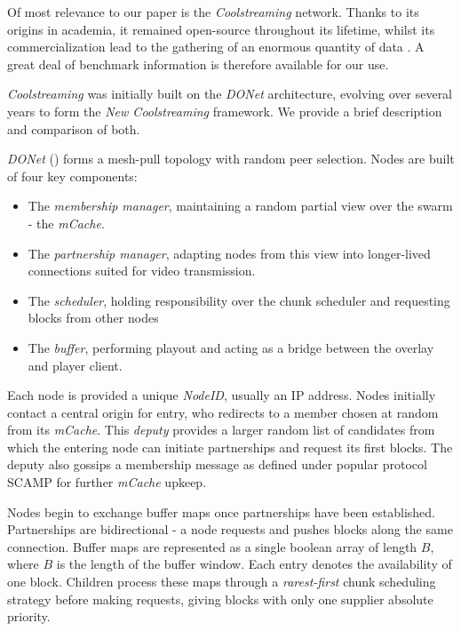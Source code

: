 \documentclass[12pt,a4paper]{article}
\begin{document}
Of most relevance to our paper is the \textit{Coolstreaming} network. Thanks to its origins in academia, it remained open-source throughout its lifetime, whilst its commercialization lead to the gathering of an enormous quantity of data \cite{Li2007}. A great deal of benchmark information is therefore available for our use.

\textit{Coolstreaming} was initially built on the \textit{DONet} architecture, evolving over several years to form the \textit{New Coolstreaming} framework. We provide a brief description and comparison of both.

\textit{DONet} (\cite{Zhang2005}) forms a mesh-pull topology with random peer selection. Nodes are built of four key components:

\begin{itemize}
	\item The \textit{membership manager}, maintaining a random partial view over the swarm - the \textit{mCache}.
	\item The \textit{partnership manager}, adapting nodes from this view into longer-lived connections suited for video transmission.
	\item The \textit{scheduler}, holding responsibility over the chunk scheduler and requesting blocks from other nodes
	\item The \textit{buffer}, performing playout and acting as a bridge between the overlay and player client.
\end{itemize} 

Each node is provided a unique \textit{NodeID}, usually an IP address. Nodes initially contact a central origin for entry, who redirects to a member chosen at random from its \textit{mCache}. This \textit{deputy} provides a larger random list of candidates from which the entering node can initiate partnerships and request its first blocks. The deputy also gossips a membership message as defined under popular protocol SCAMP for further \textit{mCache} upkeep.

Nodes begin to exchange buffer maps once partnerships have been established. Partnerships are bidirectional - a node requests and pushes blocks along the same connection. Buffer maps are represented as a single boolean array of length \(B\), where \(B\) is the length of the buffer window. Each entry denotes the availability of one block. Children process these maps through a \textit{rarest-first} chunk scheduling strategy before making requests, giving blocks with only one supplier absolute priority.
\end{document}
